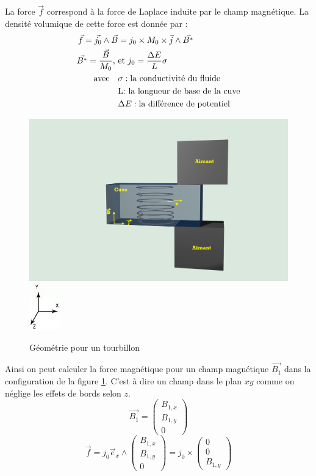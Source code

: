 \documentclass[a4paper,12pt,titlepage]{report}
\begin{document}
\begin{onehalfspace}
La force $\vec{f}$ correspond à la force de Laplace induite par le champ magnétique. La densité volumique de cette force est donnée par :
\[
\begin{aligned}
	\vec{f}=\vec{j_0}\land\vec{B}&=j_0\times M_0\times \vec{j}\wedge \vec{B^*} \\
	 \vec{B^*} =\frac{\vec{B}}{M_0}, 
	\ &\text{et} \ j_0=\frac{\Delta E}{L}\sigma
	\\
\text{avec} \quad
&\sigma : \text{la conductivité du fluide }
\\%
&\text{L: la longueur de base de la cuve} \\
&\Delta E : \text{la différence de potentiel}
\end{aligned} \\
\]
\begin{figure}[!h]
\begin{center}
\includegraphics[height = 6 cm, keepaspectratio]{graphes/champvec2.png}
\includegraphics[height =2cm, keepaspectratio]{graphes/repere.jpg}
\caption{Géométrie pour un tourbillon}
\label{figure ty}
\end{center}
\end{figure}
Ainsi on peut calculer la force magnétique pour un champ magnétique $\vec{B_1}$ dans la configuration de la figure \ref{figure ty}. C'est à dire un champ dans le plan $xy$ comme on néglige les effets de bords selon $z$.
\[
	\vec{B_1} = 
	\begin{pmatrix}
   		B_{1,x}\\
  		 B _{1,y}\\
  		 0
	\end{pmatrix} 
\]
\[
	\vec{f}=j_0\vec{e}_{x}
	\wedge\begin{pmatrix}
   		B_{1,x}\\
   		B _{1,y}\\
   		0
\end{pmatrix}=
j_0\times \begin{pmatrix}
  			0\\
   			0\\
    		B_{1,y}
			\end{pmatrix} 
\]


\end{onehalfspace}
\end{document}
